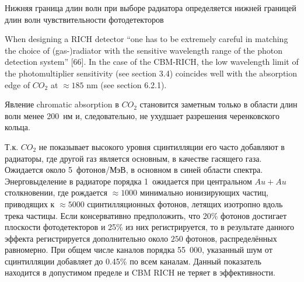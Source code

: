 
Нижняя граница длин волн при выборе радиатора определяется нижней границей длин волн чувствительности фотодетекторов

When designing a RICH detector ``one has to be extremely careful in matching the choice of (gas-)radiator with the sensitive wavelength range of the photon detection system'' [66]. In the case of the CBM-RICH, the low wavelength limit of the photomultiplier sensitivity (see section 3.4) coincides well with the absorption edge of $CO_{2}$ at $\approx 185$ nm (see section 6.2.1).

Явление chromatic absorption в $CO_{2}$ становится заметным только в области длин волн менее 200~нм и, следовательно, не ухудшает разрешения черенковского кольца.


Т.к. $CO_{2}$ не показывает высокого уровня сцинтилляции его часто добавляют в радиаторы, где другой газ является основным, в качестве гасящего газа. Ожидается около 5~фотонов/МэВ, в основном в синей области спектра. Энерговыделение в радиаторе порядка 1~\GeV ожидается при центральном $Au+Au$ столкновении, где рождается $\approx 1000$ минимально ионизирующих частиц, приводящих к $\approx 5000$ сцинтилляционных фотонов, летящих изотропно вдоль трека частицы. Если консервативно предположить, что 20\% фотонов достигает плоскости фотодетекторов и 25\% из них регистрируется, то в результате данного эффекта регистрируется дополнительно около $250$ фотонов, распределённых равномерно. При общем числе каналов порядка 55~000, указанный шум от сцинтилляции добавляет до 0.45\% \todo по всем каналам. Данный показатель находится в допустимом пределе и CBM RICH не теряет в эффективности.

